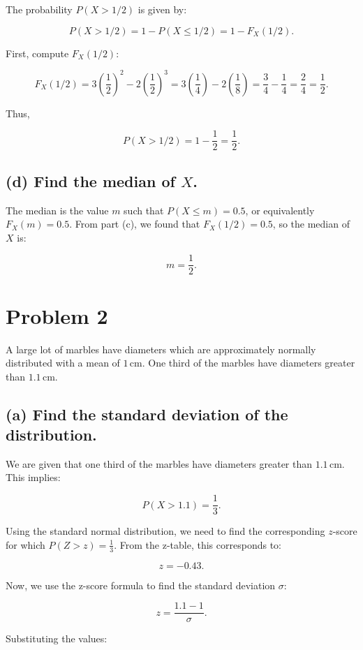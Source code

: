 \documentclass{article} %
\begin{document}
The probability \( P(X > 1/2) \) is given by:

\[
P(X > 1/2) = 1 - P(X \leq 1/2) = 1 - F_X(1/2).
\]

First, compute \( F_X(1/2) \):

\[
F_X(1/2) = 3\left( \frac{1}{2} \right)^2 - 2\left( \frac{1}{2} \right)^3
= 3\left( \frac{1}{4} \right) - 2\left( \frac{1}{8} \right)
= \frac{3}{4} - \frac{1}{4} = \frac{2}{4} = \frac{1}{2}.
\]

Thus,

\[
P(X > 1/2) = 1 - \frac{1}{2} = \frac{1}{2}.
\]

\subsection*{(d) Find the median of \( X \).}

The median is the value \( m \) such that \( P(X \leq m) = 0.5 \), or equivalently \( F_X(m) = 0.5 \). From part (c), we found that \( F_X(1/2) = 0.5 \), so the median of \( X \) is:

\[
m = \frac{1}{2}.
\]

\section*{Problem 2}

A large lot of marbles have diameters which are approximately normally distributed with a mean of \(1 \, \text{cm}\). One third of the marbles have diameters greater than \(1.1 \, \text{cm}\).

\subsection*{(a) Find the standard deviation of the distribution.}

We are given that one third of the marbles have diameters greater than \(1.1 \, \text{cm}\). This implies:

\[
P(X > 1.1) = \frac{1}{3}.
\]

Using the standard normal distribution, we need to find the corresponding \(z\)-score for which \(P(Z > z) = \frac{1}{3}\). From the z-table, this corresponds to:

\[
z = -0.43.
\]

Now, we use the z-score formula to find the standard deviation \( \sigma \):

\[
z = \frac{1.1 - 1}{\sigma}.
\]

Substituting the values:
\end{document}
